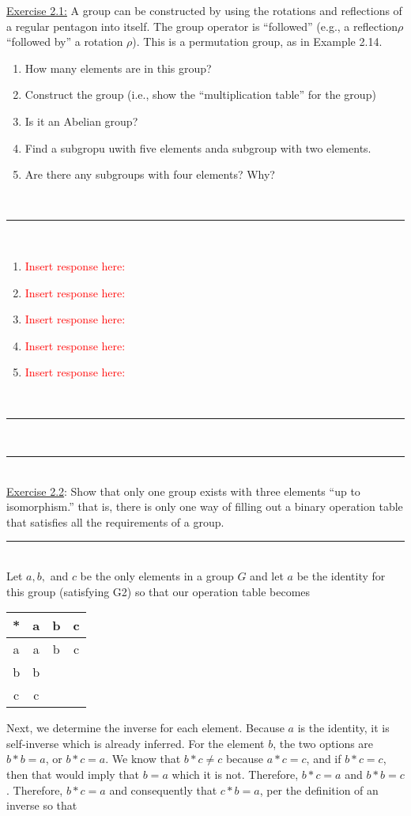 \documentclass{article}
\newcommand{\problemsep}{\leavevmode\\[0.05in] \rule[\baselineskip/4]{\textwidth}{1pt} \\[0.005in] \rule[\baselineskip]{\textwidth}{1pt}\vspace{-\baselineskip}\leavevmode\\[0.05in]}
\newcommand{\statementsep}{\leavevmode\\[0.005in] \rule[\baselineskip/4]{\textwidth}{0.4pt}\leavevmode\\[0.005in]}
\begin{document}
\noindent\underline{Exercise 2.1:} A group can be constructed by using the rotations and reflections of a regular pentagon into itself. The group operator is ``followed'' (e.g., a reflection$\rho$ ``followed by'' a rotation $\rho$). This is a permutation group, as in Example 2.14.
\begin{enumerate}
	\item How many elements are in this group?
	\item Construct the group (i.e., show the ``multiplication table'' for the group)
	\item Is it an Abelian group?
	\item Find a subgropu uwith five elements anda subgroup with two elements.
	\item Are there any subgroups with four elements? Why?
\end{enumerate}
\statementsep
\begin{enumerate}
	\item \textcolor{red}{Insert response here: }
	\item \textcolor{red}{Insert response here: } 
	\item \textcolor{red}{Insert response here: } 
	\item \textcolor{red}{Insert response here: } 
	\item \textcolor{red}{Insert response here: } 
\end{enumerate} 
\problemsep
\noindent\underline{Exercise 2.2}: 
Show that only one group exists with three elements ``up to isomorphism.'' that is, there is only one way of filling out a binary operation table that satisfies all the requirements of a group.
\statementsep
Let $a, b, $ and $c$ be the only elements in a group $G$ and let $a$ be the identity for this group (satisfying G2) so that our operation table becomes
\begin{center}\begin{tabular}{c | c c c}
	* & a & b & c \\ \hline
  a & a & b & c \\
  b & b &   &   \\
  c & c &   &   \\
\end{tabular} \end{center}
Next, we determine the inverse for each element. Because $a$ is the identity, it is self-inverse which is already inferred. For the element $b$, the two options are $b*b = a$, or $b*c = a$. We know that $b*c \ne c$ because $a*c = c$, and if $b*c = c$, then that would imply that $b = a$ which it is not. Therefore, $b*c = a$ and $b*b = c$. Therefore, $b*c = a$ and consequently that $c*b = a$, per the definition of an inverse so that
\end{document}
